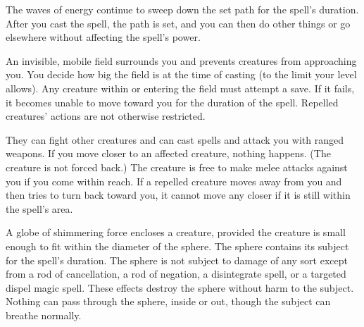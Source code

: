\begin{multicols}{2}
\begin{small}
\smallskip\noindent The waves of energy continue to sweep down the set path for the spell's duration. After you cast the spell, the path is set, and you can then do other things or go elsewhere without affecting the spell's power.

\noindent An invisible, mobile field surrounds you and prevents creatures from approaching you. You decide how big the field is at the time of casting (to the limit your level allows). Any creature within or entering the field must attempt a save. If it fails, it becomes unable to move toward you for the duration of the spell. Repelled creatures' actions are not otherwise restricted.

\smallskip\noindent They can fight other creatures and can cast spells and attack you with ranged weapons. If you move closer to an affected creature, nothing happens. (The creature is not forced back.) The creature is free to make melee attacks against you if you come within reach. If a repelled creature moves away from you and then tries to turn back toward you, it cannot move any closer if it is still within the spell's area.


\noindent A globe of shimmering force encloses a creature, provided the creature is small enough to fit within the diameter of the sphere. The sphere contains its subject for the spell's duration. The sphere is not subject to damage of any sort except from a rod of cancellation, a rod of negation, a disintegrate spell, or a targeted dispel magic spell. These effects destroy the sphere without harm to the subject. Nothing can pass through the sphere, inside or out, though the subject can breathe normally.


\end{small}
\end{multicols}
